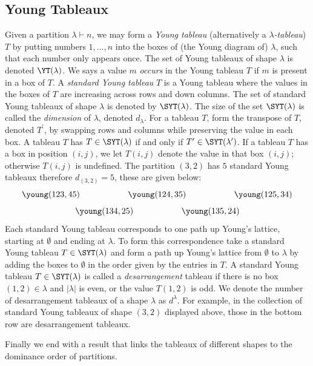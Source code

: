 \documentclass[11pt]{report}
\begin{document}
\subsection{Young Tableaux}
\label{chpt4:subsec:youngtableau}
Given a partition $\lambda\vdash n$, we may form a \emph{Young tableau} (alternatively a \emph{$\lambda$-tableau}) $T$ 
by putting numbers $1,\ldots, n$ into the boxes of (the Young diagram of) $\lambda$, such that each number only appears once. The set of Young tableaux of shape $\lambda$ is denoted $\YT(\lambda)$.	We says a value $m$ \emph{occurs} in the Young tableau $T$ if $m$ is present in a box of $T$. A \emph{standard Young tableau} $T$ is a Young tableau where the values in the boxes of $T$ 
are increasing across rows and down columns. 
The set of standard Young tableaux of shape $\lambda$  is 
denoted by $\SYT(\lambda)$. The size of the set $\SYT(\lambda)$ is
called the \emph{dimension} of $\lambda$, denoted $d_{\lambda}$. 
For a tableau $T$, form the transpose of $T$, denoted $T^{\prime}$, by 
swapping rows and columns while preserving the value in each box. A tableau $T$ has $T \in 
\SYT(\lambda)$ if and only if $T^{\prime} \in \SYT(\lambda^{\prime})$.
If a tableau $T$ has a box in position $(i,j)$, we let $T(i,j)$ denote the value in that box $(i,j)$; otherwise $T(i,j)$ is undefined. The partition $(3,2)$ has $5$ standard 
Young tableaux therefore $d_{(3,2)} = 5$, these are given below:
\[\young(123,45) \hspace{2cm} \young(124,35) \hspace{2cm} \young(125,34)\]
\[\young(134,25) \hspace{2cm} \young(135,24)\]
Each standard Young tableau corresponds to one path up Young's lattice, starting at $\emptyset$ and ending at $\lambda$. To form this correspondence take a standard Young tableau $T\in \SYT(\lambda)$ and form a path up Young's lattice  from $\emptyset$ to $\lambda$ by adding the boxes to $\emptyset$ in the order given by the entries in $T$. 
A standard Young tableau $T \in \SYT(\lambda)$ is called a 
\emph{desarrangement} tableau if there is no box $(1,2) \in \lambda$ and 
$|\lambda|$ is even, or the value $T(1,2)$ is odd. We denote the number of 
desarrangement tableaux of a shape $\lambda$ as $d^{\lambda}$. For example, in the collection of standard Young tableaux of shape $(3,2)$ displayed above, those in the bottom row are  desarrangement tableaux.

Finally we end with a result that links the tableaux of different shapes to the dominance order of partitions.
\end{document}
